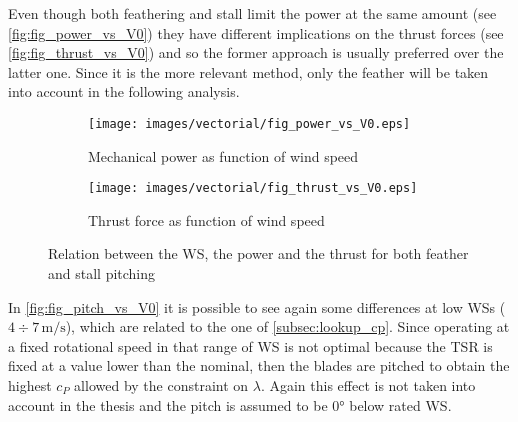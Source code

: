 Even though both feathering and stall limit the power at the same amount (see \autoref{fig:fig_power_vs_V0}) they have different implications on the thrust forces (see \autoref{fig:fig_thrust_vs_V0}) and so the former approach is usually preferred over the latter one. Since it is the more relevant method, only the feather will be taken into account in the following analysis.

\begin{figure}[htb]
    \centering
    \begin{subfigure}{0.49\textwidth}
    \centering
    \texttt{[image: images/vectorial/fig\_power\_vs\_V0.eps]}
    \caption{Mechanical power as function of wind speed}
    \label{fig:fig_power_vs_V0}
    \end{subfigure}
    \begin{subfigure}{0.49\textwidth}
    \texttt{[image: images/vectorial/fig\_thrust\_vs\_V0.eps]}
    \caption{Thrust force as function of wind speed}
    \label{fig:fig_thrust_vs_V0}
    \end{subfigure}
    \caption{Relation between the \acrshort{WS}, the power and the thrust for both feather and stall pitching}
    \label{fig:P_T_vs_V0}
\end{figure}

In \autoref{fig:fig_pitch_vs_V0} it is possible to see again some differences at low \acrshort{WSs} ($4\div7 \, \si{\meter\per\second}$), which are related to the one of \autoref{subsec:lookup_cp}. Since operating at a fixed rotational speed in that range of \acrshort{WS} is not optimal because the \acrshort{TSR} is fixed at a value lower than the nominal, then the blades are pitched to obtain the highest $c_P$ allowed by the constraint on $\lambda$. Again this effect is not taken into account in the thesis and the pitch is assumed to be 0$\si{\degree}$ below rated \acrshort{WS}.
\newpage